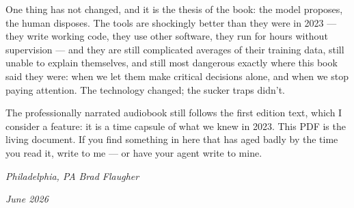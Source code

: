 One thing has not changed, and it is the thesis of the book: the model proposes, the human disposes. The tools are shockingly better than they were in 2023 --- they write working code, they use other software, they run for hours without supervision --- and they are still complicated averages of their training data, still unable to explain themselves, and still most dangerous exactly where this book said they were: when we let them make critical decisions alone, and when we stop paying attention. The technology changed; the sucker traps didn't.

The professionally narrated audiobook still follows the first edition text, which I consider a feature: it is a time capsule of what we knew in 2023. This PDF is the living document. If you find something in here that has aged badly by the time you read it, write to me --- or have your agent write to mine.

\textit{Philadelphia, PA} \hfill \textit{Brad Flaugher}

\textit{June 2026}
